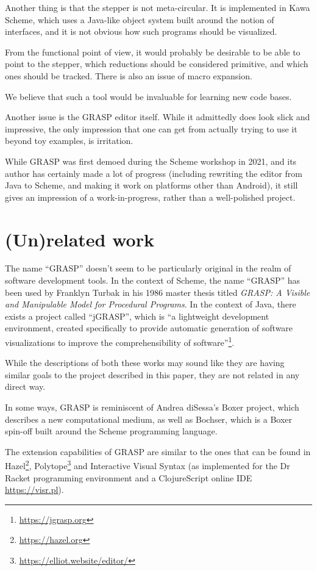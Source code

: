 \documentclass[acmsmall]{acmart}
\begin{document}
Another thing is that the stepper is not meta-circular. It is
implemented in Kawa Scheme, which uses a Java-like object system built
around the notion of interfaces, and it is not obvious how such
programs should be visualized.

From the functional point of view, it would probably be desirable to be
able to point to the stepper, which reductions should be considered
primitive, and which ones should be tracked. There is also an issue
of macro expansion.

We believe that such a tool would be invaluable for learning new
code bases.

Another issue is the GRASP editor itself. While it admittedly does
look slick and impressive, the only impression that one can get from
actually trying to use it beyond toy examples, is irritation.

While GRASP was first demoed during the Scheme workshop in
2021\cite{Godek2021}, and its author has certainly made a lot of
progress (including rewriting the editor from Java to Scheme, and
making it work on platforms other than Android), it still gives an
impression of a work-in-progress, rather than a well-polished project.

\section{(Un)related work}

The name ``GRASP'' doesn't seem to be particularly original in the
realm of software development tools. In the context of Scheme, the
name ``GRASP'' has been used by Franklyn Turbak in his 1986 master
thesis titled \textit{GRASP: A Visible and Manipulable Model for
  Procedural Programs}\cite{Turbak}. In the context of Java, there
exists a project called ``jGRASP'', which is ``a lightweight
development environment, created specifically to provide automatic
generation of software visualizations to improve the comprehensibility
of software''\footnote{\url{https://jgrasp.org}}.

While the descriptions of both these works may sound like they are
having similar goals to the project described in this paper, they are
not related in any direct way.

In some ways, GRASP is reminiscent of Andrea diSessa's Boxer
project\cite{Boxer}, which describes a new computational medium, as
well as Bochser\cite{Bochser}, which is a Boxer spin-off built around
the Scheme programming language.

The extension capabilities of GRASP are similar to the ones that can
be found in Hazel\footnote{\url{https://hazel.org}},
Polytope\footnote{\url{https://elliot.website/editor/}} and
Interactive Visual Syntax (as implemented for the Dr Racket
programming environment and a ClojureScript online IDE
\url{https://visr.pl})\cite{Andersen}.
\end{document}
